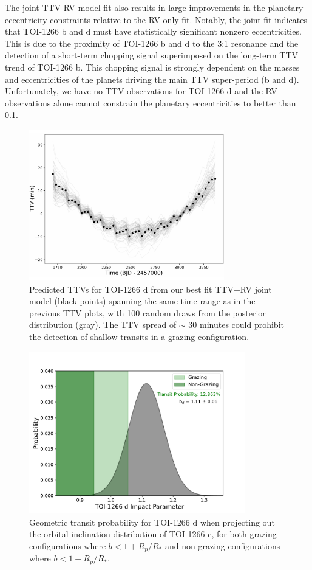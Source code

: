 \documentclass[twocolumn]{aastex631}
\begin{document}
The joint TTV-RV model fit also results in large improvements in the planetary eccentricity constraints relative to the RV-only fit. Notably, the joint fit indicates that TOI-1266 b and d must have statistically significant nonzero eccentricities. This is due to the proximity of TOI-1266 b and d to the 3:1 resonance and the detection of a short-term chopping signal superimposed on the long-term TTV trend of TOI-1266 b. This chopping signal is strongly dependent on the masses and eccentricities of the planets driving the main TTV super-period (b and d). Unfortunately, we have no TTV observations for TOI-1266 d and the RV observations alone cannot constrain the planetary eccentricities to better than 0.1. 

\begin{figure}
  \includegraphics[width=8.5cm]{TOI_1266d_TTV_prediction_new.pdf}
  \caption{Predicted TTVs for TOI-1266 d from our best fit TTV+RV joint model (black points) spanning the same time range as in the previous TTV plots, with 100 random draws from the posterior distribution (gray). The TTV spread of $\sim$ 30 minutes could prohibit the detection of shallow transits in a grazing configuration.}
  \label{fig:d TTVs}
\end{figure}

\begin{figure}
  \includegraphics[width=9.4cm]{1266d_impactparam.pdf}
  \caption{Geometric transit probability for TOI-1266 d when projecting out the orbital inclination distribution of TOI-1266 c, for both grazing configurations where $b < 1 + R_p/R_*$ and non-grazing configurations where $b < 1 - R_p/R_*$.}
  \label{fig:d transit prob}
\end{figure}
\end{document}
